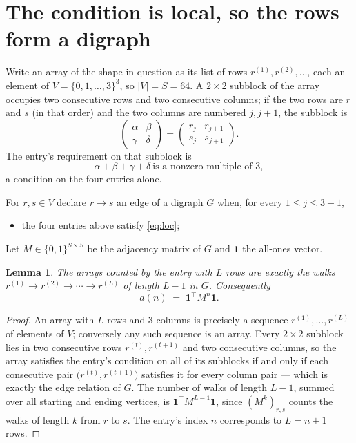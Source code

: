 \documentclass[11pt,a4paper]{article}
\theoremstyle{plain}
\newtheorem{lemma}[theorem]{Lemma}
\theoremstyle{definition}
\begin{document}
\section{The condition is local, so the rows form a digraph}

Write an array of the shape in question as its list of rows
$r^{(1)},r^{(2)},\dots$, each an element of
$V=\{0,1,\dots,3\}^{3}$, so $|V|=S=64$. A $2\times2$ subblock of the array
occupies two consecutive rows and two consecutive columns; if the two rows are $r$
and $s$ (in that order) and the two columns are numbered $j,j+1$,
the subblock is
\[
\begin{pmatrix}\alpha&\beta\\\gamma&\delta\end{pmatrix}=\begin{pmatrix}r_j&r_{j+1}\\s_j&s_{j+1}\end{pmatrix}.
\]
The entry's requirement on that subblock is
\begin{equation}\label{eq:loc}
\alpha+\beta+\gamma+\delta\ \text{is a nonzero multiple of }3,
\end{equation}
a condition on the four entries alone.

For $r,s\in V$ declare $r\to s$ an edge of a digraph $G$ when, for every
$1\le j\le 3-1$,
\begin{itemize}
\item the four entries above satisfy \eqref{eq:loc};

\end{itemize}
Let $M\in\{0,1\}^{S\times S}$ be the adjacency matrix of $G$ and $\mathbf{1}$ the
all-ones vector.

\begin{lemma}\label{lem:walk}
The arrays counted by the entry with $L$ rows are exactly the walks
$r^{(1)}\to r^{(2)}\to\cdots\to r^{(L)}$ of length $L-1$ in $G$. Consequently
\[
a(n)\;=\;\mathbf{1}^{\!\top}M^{n}\mathbf{1} .
\]
\end{lemma}

\begin{proof}
An array with $L$ rows and $3$ columns is precisely a sequence
$r^{(1)},\dots,r^{(L)}$ of elements of $V$; conversely any such sequence is an array.
Every $2\times2$ subblock lies in two consecutive rows $r^{(t)},r^{(t+1)}$ and two
consecutive columns, so the array satisfies the entry's condition on all of its subblocks
if and only if each consecutive pair $\bigl(r^{(t)},r^{(t+1)}\bigr)$ satisfies it for
every column pair --- which is exactly the edge relation of $G$. The number of walks of
length $L-1$, summed over all starting and ending vertices, is
$\mathbf{1}^{\!\top}M^{L-1}\mathbf{1}$, since $(M^{k})_{r,s}$ counts the walks of
length $k$ from $r$ to $s$. The entry's index $n$ corresponds to $L=n+1$ rows.
\end{proof}
\end{document}
